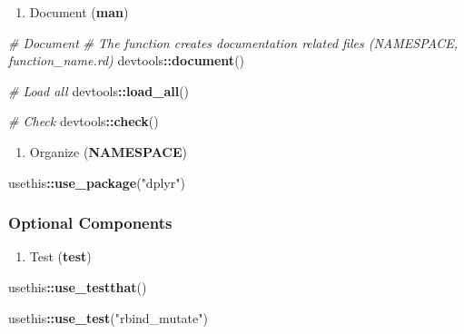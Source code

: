 \documentclass[
]{book}
\newenvironment{Shaded}{\begin{snugshade}}{\end{snugshade}}
\newcommand{\CommentTok}[1]{\textcolor[rgb]{0.56,0.35,0.01}{\textit{#1}}}
\newcommand{\KeywordTok}[1]{\textcolor[rgb]{0.13,0.29,0.53}{\textbf{#1}}}
\newcommand{\NormalTok}[1]{#1}
\newcommand{\OperatorTok}[1]{\textcolor[rgb]{0.81,0.36,0.00}{\textbf{#1}}}
\newcommand{\StringTok}[1]{\textcolor[rgb]{0.31,0.60,0.02}{#1}}
\providecommand{\tightlist}{%
  \setlength{\itemsep}{0pt}\setlength{\parskip}{0pt}}
\begin{document}
\begin{enumerate}
\def\labelenumi{\arabic{enumi}.}
\setcounter{enumi}{2}
\tightlist
\item
  Document (\textbf{man})
\end{enumerate}

\begin{Shaded}
\begin{Highlighting}[]
\CommentTok{\# Document }
\CommentTok{\# The function creates documentation related files (NAMESPACE, function\_name.rd)}
\NormalTok{devtools}\OperatorTok{::}\KeywordTok{document}\NormalTok{()}

\CommentTok{\# Load all }
\NormalTok{devtools}\OperatorTok{::}\KeywordTok{load\_all}\NormalTok{()}

\CommentTok{\# Check }
\NormalTok{devtools}\OperatorTok{::}\KeywordTok{check}\NormalTok{()}
\end{Highlighting}
\end{Shaded}

\begin{enumerate}
\def\labelenumi{\arabic{enumi}.}
\setcounter{enumi}{3}
\tightlist
\item
  Organize (\textbf{NAMESPACE})
\end{enumerate}

\begin{Shaded}
\begin{Highlighting}[]
\NormalTok{usethis}\OperatorTok{::}\KeywordTok{use\_package}\NormalTok{(}\StringTok{"dplyr"}\NormalTok{)}
\end{Highlighting}
\end{Shaded}

\hypertarget{optional-components}{%
\subsubsection{Optional Components}\label{optional-components}}

\begin{enumerate}
\def\labelenumi{\arabic{enumi}.}
\tightlist
\item
  Test (\textbf{test})
\end{enumerate}

\begin{Shaded}
\begin{Highlighting}[]
\NormalTok{usethis}\OperatorTok{::}\KeywordTok{use\_testthat}\NormalTok{()}

\NormalTok{usethis}\OperatorTok{::}\KeywordTok{use\_test}\NormalTok{(}\StringTok{"rbind\_mutate"}\NormalTok{)}
\end{Highlighting}
\end{Shaded}
\end{document}
